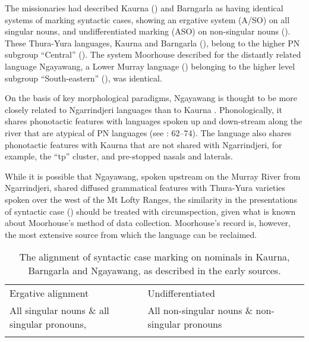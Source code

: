 The missionaries had described Kaurna (\citealt{teichelmann_outlines_1840}) and Barngarla \citep{schurmann_letter_1844} as having identical systems of marking syntactic cases, showing an ergative system ({A/SO}) on all singular nouns, and undifferentiated marking ({ASO}) on non-singular nouns (). These Thura-Yura languages, Kaurna and Barngarla (), belong to the higher PN subgroup “Central” (\citealt{bowern_computational_2012}). The system Moorhouse described for the distantly related language Ngayawang, a Lower Murray language () belonging to the higher level subgroup “South-eastern” (\citealt{bowern_computational_2012}), was identical.

On the basis of key morphological paradigms, Ngayawang is thought to be more closely related to Ngarrindjeri languages than to Kaurna \citep[170]{simpson_early_1996}. Phonologically, it shares phonotactic features with languages spoken up and down-stream along the river that are atypical of PN languages (see \citealt{horgen_languages_2004}: 62--74). The language also shares phonotactic features with Kaurna that are not shared with Ngarrindjeri, for example, the “tp” cluster, and pre-stopped nasals and laterals.

While it is possible that Ngayawang, spoken upstream on the Murray River from Ngarrindjeri, shared diffused grammatical features with Thura-Yura varieties spoken over the west of the Mt Lofty Ranges, the similarity in the presentations of syntactic case () should be treated with circumspection, given what is known about Moorhouse’s method of data collection. Moorhouse’s record is, however, the most extensive source from which the language can be reclaimed.


\begin{table}
\begin{tabularx}{.8\textwidth}{QQ}
\lsptoprule
{} \\
\midrule
Ergative alignment  & Undifferentiated \\
\midrule
All singular nouns \& \newline all singular pronouns, & All non-singular nouns \& non-singular pronouns\\
\lspbottomrule
\end{tabularx}
\caption{The alignment of syntactic case marking on nominals in Kaurna, Barngarla and Ngayawang, as described in the early sources.}
\label{tab:key:122}
\end{table}

